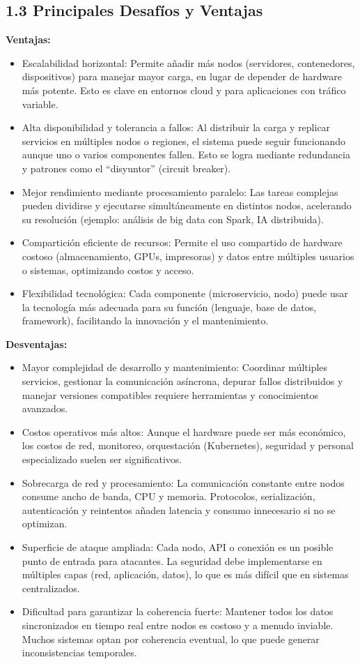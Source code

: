 \documentclass[a4paper,12pt]{article}
\begin{document}
\subsection*{1.3 Principales Desafíos y Ventajas}
\textbf{Ventajas:}
\begin{itemize}
    \item Escalabilidad horizontal: Permite añadir más nodos (servidores, contenedores, dispositivos) para manejar mayor carga, en lugar de depender de hardware más potente. Esto es clave en entornos cloud y para aplicaciones con tráfico variable.
    \item Alta disponibilidad y tolerancia a fallos: Al distribuir la carga y replicar servicios en múltiples nodos o regiones, el sistema puede seguir funcionando aunque uno o varios componentes fallen. Esto se logra mediante redundancia y patrones como el “disyuntor” (circuit breaker).
    \item Mejor rendimiento mediante procesamiento paralelo: Las tareas complejas pueden dividirse y ejecutarse simultáneamente en distintos nodos, acelerando su resolución (ejemplo: análisis de big data con Spark, IA distribuida).
    \item Compartición eficiente de recursos: Permite el uso compartido de hardware costoso (almacenamiento, GPUs, impresoras) y datos entre múltiples usuarios o sistemas, optimizando costos y acceso.
    \item Flexibilidad tecnológica: Cada componente (microservicio, nodo) puede usar la tecnología más adecuada para su función (lenguaje, base de datos, framework), facilitando la innovación y el mantenimiento.
\end{itemize}
\textbf{Desventajas:}
\begin{itemize}
    \item Mayor complejidad de desarrollo y mantenimiento: Coordinar múltiples servicios, gestionar la comunicación asíncrona, depurar fallos distribuidos y manejar versiones compatibles requiere herramientas y conocimientos avanzados.
    \item Costos operativos más altos: Aunque el hardware puede ser más económico, los costos de red, monitoreo, orquestación (Kubernetes), seguridad y personal especializado suelen ser significativos.
    \item Sobrecarga de red y procesamiento: La comunicación constante entre nodos consume ancho de banda, CPU y memoria. Protocolos, serialización, autenticación y reintentos añaden latencia y consumo innecesario si no se optimizan.
    \item Superficie de ataque ampliada: Cada nodo, API o conexión es un posible punto de entrada para atacantes. La seguridad debe implementarse en múltiples capas (red, aplicación, datos), lo que es más difícil que en sistemas centralizados.
    \item Dificultad para garantizar la coherencia fuerte: Mantener todos los datos sincronizados en tiempo real entre nodos es costoso y a menudo inviable. Muchos sistemas optan por coherencia eventual, lo que puede generar inconsistencias temporales.
\end{itemize}
\end{document}
